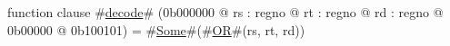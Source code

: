function clause #\hyperref[zdecode]{decode}# (0b000000 @ rs : regno @ rt : regno @ rd : regno @ 0b00000 @ 0b100101) =
  #\hyperref[zSome]{Some}#(#\hyperref[zOR]{OR}#(rs, rt, rd))
